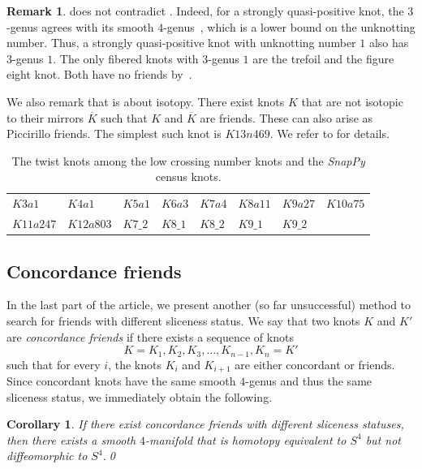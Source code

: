 \documentclass{amsart} %
\theoremstyle{thm}
\newtheorem{cor}[Theorem]{Corollary}
\theoremstyle{definition}
\newtheorem{rem}[Theorem]{Remark}
\numberwithin{equation}{section}
\begin{document}
\begin{rem}
     does not contradict . Indeed, for a strongly quasi-positive knot, the $3$-genus agrees with its smooth $4$-genus~\cite{Rudolph}, which is a lower bound on the unknotting number. Thus, a strongly quasi-positive knot with unknotting number $1$ also has $3$-genus $1$. The only fibered knots with $3$-genus $1$ are the trefoil and the figure eight knot. Both have no friends by~\cite{Gabai}. 
    
    We also remark that  is about isotopy. There exist knots $K$ that are not isotopic to their mirrors $\overline{K}$ such that $K$ and $\overline{K}$ are friends. These can also arise as Piccirillo friends. The simplest such knot is $K13n469$. We refer to \cite{Kegel_Weiss} for details.
\end{rem}

\begin{table}[htbp] 
\caption{The twist knots among the low crossing number knots and the {\em SnapPy} census knots.}
\label{tab:twist}
\begin{tabular}{@{}llllllll@{}}
\toprule
  $K3a1$ & $K4a1$ & $K5a1$ & $K6a3$ & $K7a4$ & $K8a11$ & $K9a27$ & $K10a75$ \\ 
  $K11a247$ & $K12a803$ & $K7\_2$ & $K8\_1$ & $K8\_2$ & $K9\_1$& $K9\_2$ & \\
\bottomrule
\end{tabular}
\end{table}

\subsection{Concordance friends}

In the last part of the article, we present another (so far unsuccessful) method to search for friends with different sliceness status. We say that two knots $K$ and $K'$ are \textit{concordance friends} if there exists a sequence of knots 
$$K=K_1,K_2,K_3,\ldots,K_{n-1},K_n=K'$$ 
such that for every $i$, the knots $K_i$ and $K_{i+1}$ are either concordant or friends. Since concordant knots have the same smooth $4$-genus and thus the same sliceness status, we immediately obtain the following.

\begin{cor}
    If there exist concordance friends with different sliceness statuses, then there exists a smooth $4$-manifold that is homotopy equivalent to $S^4$ but not diffeomorphic to $S^4$.\qed
\end{cor}
\end{document}
